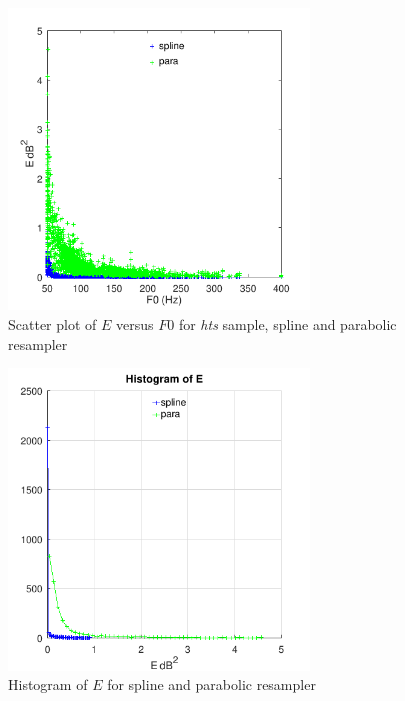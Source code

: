 \documentclass{article}
\begin{document}
\begin{figure}[h]
\caption{Scatter plot of $E$ versus $F0$ for \emph{hts} sample, spline and parabolic resampler}
\label{fig:ratek1_hts_E}
\begin{center}
\includegraphics[width=8cm]{ratek1_hts_E.png}
\end{center}
\end{figure}

\begin{figure}[h]
\caption{Histogram of $E$ for spline and parabolic resampler}
\label{fig:ratek1_hts_hist}
\begin{center}
\includegraphics[width=8cm]{ratek1_hts_hist.png}
\end{center}
\end{figure}
\end{document}
